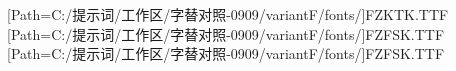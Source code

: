 \setmainfont{Times New Roman}
[Path=C:/提示词/工作区/字替对照-0909/variantF/fonts/]{FZKTK.TTF}
[Path=C:/提示词/工作区/字替对照-0909/variantF/fonts/]{FZFSK.TTF}
\newfontfamily{\fangsonglat}[Path=C:/提示词/工作区/字替对照-0909/variantF/fonts/]{FZFSK.TTF}

